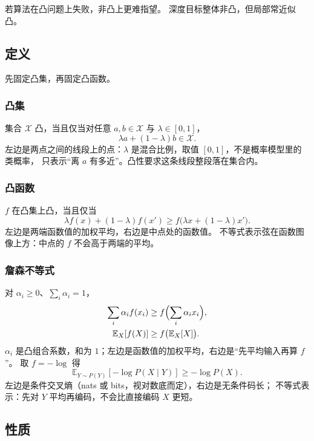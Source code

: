 

若算法在凸问题上失败，非凸上更难指望。
深度目标整体非凸，但局部常近似凸。

\subsection{定义}

先固定凸集，再固定凸函数。

\subsubsection{凸集}

集合 $\mathcal{X}$ 凸，当且仅当对任意 $a,b\in\mathcal{X}$ 与 $\lambda\in[0,1]$，
\[
\lambda a+(1-\lambda)b\in\mathcal{X}.
\]
左边是两点之间的线段上的点：$\lambda$ 是混合比例，取值 $[0,1]$，不是概率模型里的类概率，
只表示“离 $a$ 有多近”。凸性要求这条线段整段落在集合内。

\subsubsection{凸函数}

$f$ 在凸集上凸，当且仅当
\[
\lambda f(x)+(1-\lambda)f(x')
\geq
f\bigl(\lambda x+(1-\lambda)x'\bigr).
\]
左边是两端函数值的加权平均，右边是中点处的函数值。
不等式表示弦在函数图像上方：中点的 $f$ 不会高于两端的平均。

\subsubsection{詹森不等式}

对 $\alpha_i\geq 0$、$\sum_i\alpha_i=1$，
\begin{align*}
\sum_i\alpha_i f(x_i)
&\geq
f\Bigl(\sum_i\alpha_i x_i\Bigr),
\\
\mathbb{E}_X[f(X)]
&\geq
f\bigl(\mathbb{E}_X[X]\bigr).
\end{align*}
$\alpha_i$ 是凸组合系数，和为 $1$；左边是函数值的加权平均，右边是“先平均输入再算 $f$”。
取 $f=-\log$ 得
\[
\mathbb{E}_{Y\sim P(Y)}[-\log P(X\mid Y)]
\geq
-\log P(X).
\]
左边是条件交叉熵（nats 或 bits，视对数底而定），右边是无条件码长；
不等式表示：先对 $Y$ 平均再编码，不会比直接编码 $X$ 更短。

\subsection{性质}

